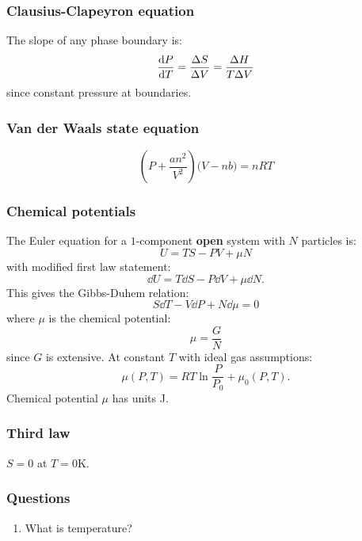 \documentclass{article}
\begin{document}
\begin{multicols*}{3}
\subsubsection*{Clausius-Clapeyron equation}
The slope of any phase boundary is:
$$\dv{P}{T}=\frac{\Delta S}{\Delta V}
=\frac{\Delta H}{T\Delta V}$$
since constant pressure at boundaries.

\subsubsection*{Van der Waals state equation}
$$\left(P+\frac{an^2}{V^2}\right)
\bigl(V-nb\bigr)=nRT$$

\subsubsection*{Chemical potentials}
The Euler equation for a $1$-component
\textbf{open} system with
$N$ particles is:
$$U=TS-PV+\mu N$$
with modified first law statement: 
$$\dd U
=T\dd S-P\dd V+\mu\dd N.$$
This gives the Gibbs-Duhem relation:
$$S\dd T-V\dd P+N\dd\mu=0$$
where $\mu$ is the chemical potential:
$$\mu=\frac{G}{N}$$
since $G$ is extensive. At constant $T$
with ideal gas assumptions:
$$\mu(P,T)=RT\ln\frac{P}{P_0}+\mu_0(P,T).$$
Chemical potential $\mu$ has units J.

\subsubsection*{Third law}
$S=0$ at $T=0$K.

\subsubsection*{Questions}
\begin{enumerate}
    \item What is temperature?
\end{enumerate}

\end{multicols*}
\end{document}
